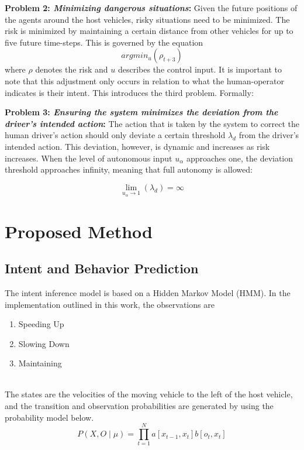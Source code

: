 \documentclass[conference]{IEEEtran}
\begin{document}
	\textbf{Problem 2: \textit{Minimizing dangerous situations}:} Given the future positions of the agents around the host vehicles, risky situations need to be minimized. The risk is minimized by maintaining a certain distance from other vehicles for up to five future time-steps. This is governed by the equation
	\begin{equation}
	argmin_{u}(\rho_{t+3})    
	\end{equation}
	where $\rho$ denotes the risk and $u$ describes the control input. It is important to note that this adjustment only occurs in relation to what the human-operator indicates is their intent. This introduces the third problem. Formally:

	\textbf{Problem 3: \textit{Ensuring the system minimizes the deviation from the driver's intended action}:} The action that is taken by the system to correct the human driver's action should only deviate a certain threshold $\lambda_{d}$ from the driver's intended action. This deviation, however, is dynamic and increases as risk increases. When the level of autonomous input $u_{\alpha}$ approaches one, the deviation threshold approaches infinity, meaning that full autonomy is allowed:
	
	\begin{equation}
	    \lim_{u_{\alpha}\xrightarrow{}1}(\lambda_{d}) = \infty
	\end{equation}
	
\section{Proposed Method}
\subsection{Intent and Behavior Prediction}
The intent inference model is based on a Hidden Markov Model (HMM). In the implementation outlined in this work, the observations are\\

\begin{varwidth}{\textwidth}
\begin{enumerate}
  \item Speeding Up
  \item Slowing Down
  \item Maintaining
\end{enumerate}
\end{varwidth}\\

The states are the velocities of the moving vehicle to the left of the host vehicle, and the transition and observation probabilities are generated by using the probability model below.
\begin{equation}
P(X, O \mid \mu) = \prod_{t=1}^{N} a[x_{t-1},x_{t}]b[o_{t},x_{t}]
\end{equation}
\end{document}

